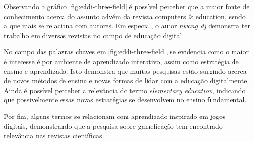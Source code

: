 Observando o gráfico \ref{fig:eddi-three-field} é possível perceber que a maior fonte de conhecimento acerca do assunto advém da revista computers $\&$ education, sendo a que mais se relaciona com autores. Em especial, o autor \textit{hwang dj} demonstra ter trabalho em diversas revistas no campo de educação digital.

No campo das palavras chaves em \ref{fig:eddi-three-field}, se evidencia como o maior é interesse é por ambiente de aprendizado interativo, assim como estratégia de ensino e aprendizado. Isto demonstra que muitas pesquisas estão surgindo acerca de novos métodos de ensino e novas formas de lidar com a educação digitalmente. Ainda é possível perceber a relevância do termo \textit{elementary education}, indicando que possivelmente essas novas estratégias se desenvolvem no ensino fundamental.

Por fim, alguns termos se relacionam com aprendizado inspirado em jogos digitais, demonstrando que a pesquisa sobre gameficação tem encontrado relevância nas revistas científicas.




